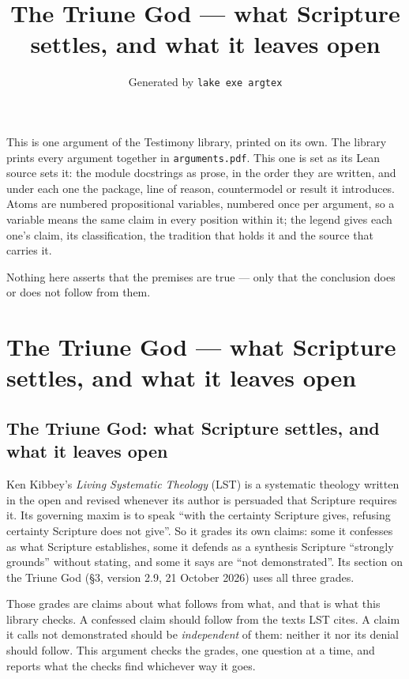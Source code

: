\documentclass[11pt,paper=\testimonypaper,DIV=13,parskip=false]{scrartcl}
\title{The Triune God — what Scripture settles, and what it leaves open}
\author{\credit{TestimonyArguments.Trinity}}
\date{Generated by \texttt{lake exe argtex}}
\begin{document}
\maketitle
\noindent This is one argument of the Testimony library, printed on its own. The library prints every argument together in \texttt{arguments.pdf}. This one is set as its Lean source sets it: the module docstrings as prose, in the order they are written, and under each one the package, line of reason, countermodel or result it introduces. Atoms are numbered propositional variables, numbered once per argument, so a variable means the same claim in every position within it; the legend gives each one's claim, its classification, the tradition that holds it and the source that carries it.

\noindent Nothing here asserts that the premises are true --- only that the conclusion does or does not follow from them.

\tableofcontents
\clearpage
\section*{The Triune God — what Scripture settles, and what it leaves open}

\subsection*{The Triune God: what Scripture settles, and what it leaves open}
Ken Kibbey’s \emph{Living Systematic Theology} (LST) is a systematic theology written in the open and revised whenever its author is persuaded that Scripture requires it. Its governing maxim is to speak “with the certainty Scripture gives, refusing certainty Scripture does not give”. So it grades its own claims: some it confesses as what Scripture establishes, some it defends as a synthesis Scripture “strongly grounds” without stating, and some it says are “not demonstrated”. Its section on the Triune God (§3, version 2.9, 21 October 2026) uses all three grades.

Those grades are claims about what follows from what, and that is what this library checks. A confessed claim should follow from the texts LST cites. A claim it calls not demonstrated should be \emph{independent} of them: neither it nor its denial should follow. This argument checks the grades, one question at a time, and reports what the checks find whichever way it goes.
\end{document}
